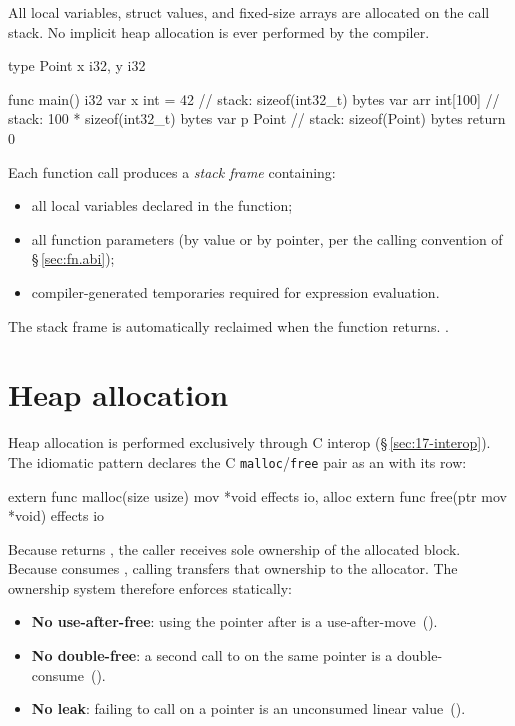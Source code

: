 \pnum
All local variables, struct values, and fixed-size arrays are allocated on
the call stack.  No implicit heap allocation is ever performed by the
compiler.

\begin{laincode}
type Point { x i32, y i32 }

func main() i32 {
    var x int = 42      // stack: sizeof(int32_t) bytes
    var arr int[100]    // stack: 100 * sizeof(int32_t) bytes
    var p Point         // stack: sizeof(Point) bytes
    return 0
}
\end{laincode}

\pnum
Each function call produces a \textit{stack frame} containing:
\begin{itemize}
  \item all local variables declared in the function;
  \item all function parameters (by value or by pointer, per the calling
        convention of \S\,\ref{sec:fn.abi});
  \item compiler-generated temporaries required for expression evaluation.
\end{itemize}

\pnum
The stack frame is automatically reclaimed when the function returns.
.

\section{Heap allocation}
\label{sec:mem.heap}

\pnum
Heap allocation is performed exclusively through C interop
(\S\,\ref{sec:17-interop}).  The idiomatic pattern declares the C
\texttt{malloc}/\texttt{free} pair as an  with its row:

\begin{laincode}
extern func malloc(size usize) mov *void effects io, alloc
extern func free(ptr mov *void) effects io
\end{laincode}

\pnum
Because  returns , the caller receives sole
ownership of the allocated block.  Because  consumes
, calling  transfers that ownership to the
allocator.  The ownership system therefore enforces statically:
\begin{itemize}
  \item \textbf{No use-after-free}: using the pointer after 
        is a use-after-move~().
  \item \textbf{No double-free}: a second call to  on the
        same pointer is a double-consume~().
  \item \textbf{No leak}: failing to call  on a 
        pointer is an unconsumed linear value~().
\end{itemize}

